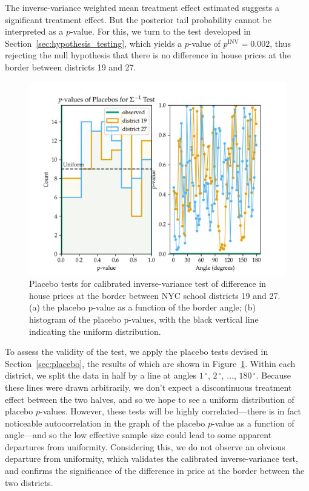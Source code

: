 \documentclass[letter,12pt]{article}
\newcommand{\degree}{{\,^\circ}}
\begin{document}
The inverse-variance weighted mean treatment effect estimated suggests a significant treatment effect.
But the posterior tail probability cannot be interpreted as a \(p\)-value.
For this, we turn to the test developed in Section~\ref{sec:hypothesis_testing}, which yields a \(p\)-value of \(p^{\mathrm{INV}}=0.002\), thus rejecting the null hypothesis that there is no difference in house prices at the border between districts 19 and 27.

\begin{figure}[tb]
    \centering
    \includegraphics[width=\textwidth,height=0.3\textheight,keepaspectratio]{../NYC/NYC_plots/placebo_invvar.png}
    \caption{\label{fig:placebo_invvar} Placebo tests for calibrated inverse-variance test of difference in house prices at the border between NYC school districts 19 and 27. 
    (a) the placebo p-value as a function of the border angle;
    (b) histogram of the placebo p-values, with the black vertical line indicating the uniform distribution.}
\end{figure}

To assess the validity of the test, we apply the placebo tests devised in Section~\ref{sec:placebo},
the results of which are shown in Figure~\ref{fig:placebo_invvar}.
Within each district, we split the data in half by a line at angles \(1\degree\), \(2\degree\), \(\dotsc\), \(180\degree\).
Because these lines were drawn arbitrarily, we don't expect a discontinuous treatment effect between the two halves, and so we hope to see a uniform distribution of placebo \(p\)-values.
However, these tests will be highly correlated---there is in fact noticeable autocorrelation in the graph of the placebo \(p\)-value as a function of angle---and so the low effective sample size could lead to some apparent departures from uniformity.
Considering this, we do not observe an obvious departure from uniformity, which validates the calibrated inverse-variance test, and confirms the significance of the difference in price at the border between the two districts.
\end{document}

